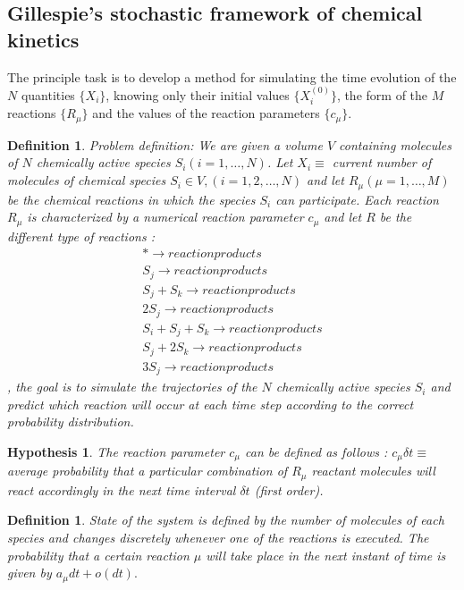\documentclass[11pt,a4paper]{article}
\newtheorem{defn}[theorem]{Definition}
\newtheorem{hyp}[theorem]{Hypothesis}
\begin{document}
\subsection{Gillespie's stochastic framework of chemical kinetics}
The principle task is to develop a method for simulating the time evolution of the $N$ quantities $\{X_{i}\}$, knowing only their initial values $\{X_{i}^{(0)}\}$, the form of the $M$ reactions $\{R_{\mu}\}$ and the values of the reaction parameters $\{c_{\mu}\}$.

\begin{defn}{Problem definition:}
We are given a volume $V$ containing molecules of $N$ chemically active species $S_{i}(i = 1, \dots, N)$. Let $X_{i} \equiv$ current number of molecules of chemical species $S_{i} \in V, (i = 1, 2, \dots, N)$ and let $R_{\mu} (\mu = 1, \dots, M)$ be the chemical reactions in which the species $S_{i}$ can participate. Each reaction $R_{\mu}$ is characterized by a numerical reaction parameter $c_{\mu}$ and let $R$ be the different type of reactions :
\begin{gather}
  {* \rightarrow reaction products}  \\
  {S_{j} \rightarrow reaction products} \\
  {S_{j} + S_{k} \rightarrow reaction products}\\
  {2S_{j} \rightarrow reaction products} \\
  {S_{i} + S_{j} + S_{k} \rightarrow reaction products}\\
  {S_{j} + 2S_{k} \rightarrow reaction products} \\
  {3S_{j} \rightarrow reaction products}
\end{gather}, the goal is to simulate the trajectories of the $N$ chemically active species $S_i$ and predict which reaction will occur at each time step according to the correct probability distribution.
\end{defn}

\begin{hyp}{}
The reaction parameter $c_{\mu}$ can be defined as follows : $c_{\mu} \delta t \equiv $ average probability that a particular combination of $R_{\mu}$ reactant molecules will react accordingly in the next time interval $\delta t$ (first order).
\end{hyp}

\begin{defn}State of the system is defined by the number of molecules of each species and changes discretely whenever one of the reactions is executed. The probability that a certain reaction $\mu$ will take place in the next instant of time is given by $a_{\mu}dt + o(dt).$
\end{defn}
\end{document}
